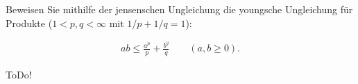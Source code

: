 
\begin{exercise}

Beweisen Sie mithilfe der jensenschen Ungleichung die youngsche Ungleichung für Produkte ($1 < p, q < \infty$ mit $1/p + 1/q = 1$):

\begin{align*}
    ab
    \leq
    \frac{a^p}{p} + \frac{b^q}{q}
    \qquad
    (a, b \geq 0).
\end{align*}

\end{exercise}


\begin{solution}

ToDo!

\end{solution}

